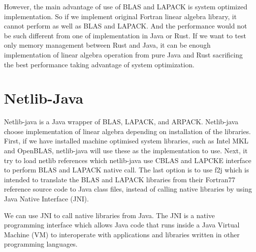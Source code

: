 However, the main advantage of use of BLAS and LAPACK is system optimized implementation. So if we implement original Fortran linear algebra library, it cannot perform as well as BLAS and LAPACK. 
And the performance would not be such different from one of implementation in Java or Rust.  If we want to test only memory management between Rust and Java, 
it can be enough implementation of linear algebra operation from  pure Java and Rust sacrificing the best performance taking advantage of system optimization. 


\section{Netlib-Java}
\label{sec:history}

Netlib-java is a Java wrapper of BLAS, LAPACK, and ARPACK. Netlib-java choose  implementation of linear algebra depending on installation of the libraries. 
First, if we have installed machine optimised system libraries, such as Intel MKL and OpenBLAS, netlib-java will use these as the implementation to use. 
Next, it try to load netlib references which netlib-java use CBLAS and LAPCKE interface to perform BLAS and LAPACK native call. 
The last option is to use f2j which is intended to translate the BLAS and LAPACK libraries from their Fortran77 reference source code to Java class files, 
instead of calling native libraries by using Java Native Interface (JNI). 

We can use JNI to call native libraries from Java. The JNI is a native programming interface which allows Java code that runs inside a Java Virtual Machine (VM) 
to interoperate with applications and libraries written in other programming languages. 

